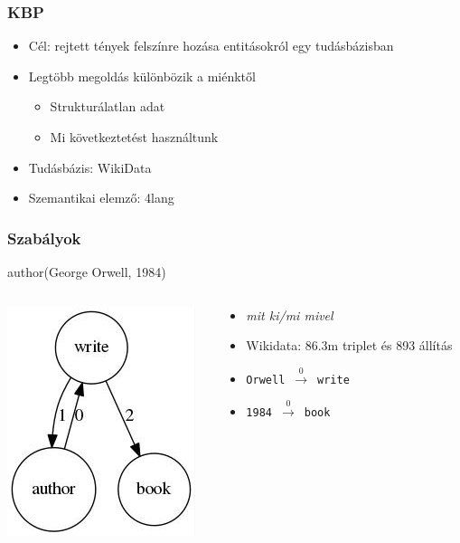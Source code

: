 \documentclass[bigger]{beamer}
\begin{document}
\begin{frame}
\frametitle{KBP} 
\begin{itemize}
	\pause \item Cél: rejtett tények felsz\'{i}nre hozása entitásokról egy tudásbázisban
	\pause \item Legtöbb megoldás különbözik a miénktől
	\begin{itemize}
		\pause \item Strukturálatlan adat
		\pause \item Mi következtetést használtunk
	\end{itemize}
	\pause \item Tudásbázis: WikiData
	\pause \item Szemantikai elemző: 4lang
\end{itemize}
\end{frame}
\begin{frame}
\frametitle{Szabályok}
\centering
\pause author(George Orwell, 1984)
\begin{columns}
	\begin{column}{0.4\textwidth}
		\pause \includegraphics[scale=0.6]{pics/author.jpg}
	\end{column}
	\begin{column}{0.6\textwidth}
		\begin{itemize}
			\pause \item \textit{mit ki/mi mivel}
			\pause \item Wikidata: 86.3m triplet és 893 áll\'{i}tás
			\pause \item \texttt{Orwell}~$\xrightarrow0$~\texttt{write} 
			\pause \item \texttt{1984}~$\xrightarrow0$~\texttt{book}
		\end{itemize}
	\end{column}
\end{columns}
\end{frame}
\end{document}
